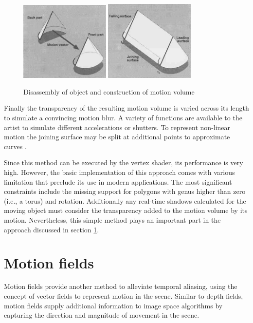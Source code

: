 \begin{figure}[h]
    \centering
    \includegraphics[width=0.4\textwidth]{images/object-splitting.png}
    \includegraphics[width=0.4\textwidth]{images/object-splitting-assembly.png}
    \caption{Disassembly of object and construction of motion volume \cite{Wloka.1996}}
    \label{fig:object-splitting}
\end{figure}

Finally the transparency of the resulting motion volume is varied across its length to simulate a convincing motion blur.
A variety of functions are available to the artist to simulate different accelerations or shutters.
To represent non-linear motion the joining surface may be split at additional points to approximate curves \cite{Wloka.1996}.

Since this method can be executed by the vertex shader, its performance is very high.
However, the basic implementation of this approach comes with various limitation that preclude its use in modern applications.
The most significant constraints include the missing support for polygons with genus higher than zero (i.e., a torus) and rotation.
Additionally any real-time shadows calculated for the moving object must consider the transparency added to the motion volume by its motion.
Nevertheless, this simple method plays an important part in the approach discussed in section \ref{ch:mb-mf}.

\section{Motion fields}
\label{ch:mb-mf}
Motion fields provide another method to alleviate temporal aliasing, using the concept of vector fields to represent motion in the scene.
Similar to depth fields, motion fields supply additional information to image space algorithms by capturing the direction and magnitude of movement in the scene.


